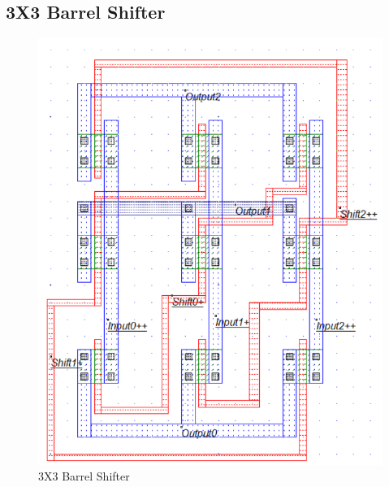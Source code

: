 \documentclass[a4paper,12pt]{article}
\begin{document}
	\subsection{3X3 Barrel Shifter}
		\begin{figure}[H]
		\centering
		\includegraphics[width=1.1\linewidth]{Images/3B}
		\caption{3X3 Barrel Shifter}
		\label{fig:2b}
	\end{figure}
\end{document}
